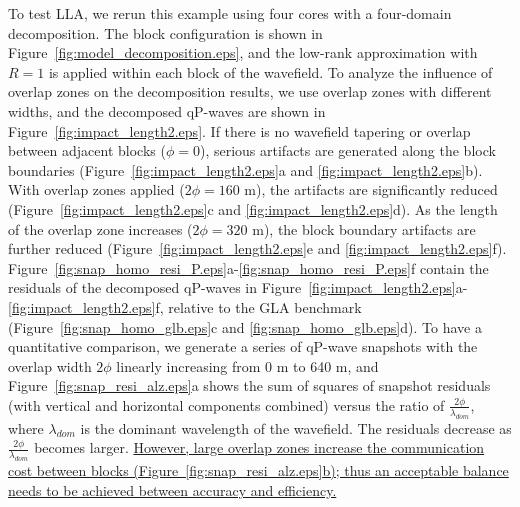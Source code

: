 \documentclass[manuscript,ulem,graphix,revised]{geophysics}
\begin{document}
To test LLA, we rerun this example using four cores with a four-domain decomposition. The block configuration is shown in Figure~\ref{fig:model_decomposition.eps}, and the low-rank approximation with $R=1$ is applied within each block of the wavefield. To analyze the influence of overlap zones on the decomposition results, we use overlap zones with different widths, and the decomposed qP-waves are shown in Figure~\ref{fig:impact_length2.eps}. If there is no wavefield tapering or overlap between adjacent blocks ($\phi=0$), serious artifacts are generated along the block boundaries (Figure~\ref{fig:impact_length2.eps}a and \ref{fig:impact_length2.eps}b). With overlap zones applied ($2\phi=160$ m), the artifacts are significantly reduced (Figure~\ref{fig:impact_length2.eps}c and \ref{fig:impact_length2.eps}d). As the length of the overlap zone increases ($2\phi=320$ m), the block boundary artifacts are further reduced (Figure~\ref{fig:impact_length2.eps}e and \ref{fig:impact_length2.eps}f). Figure~\ref{fig:snap_homo_resi_P.eps}a-\ref{fig:snap_homo_resi_P.eps}f contain the residuals of the decomposed qP-waves in Figure~\ref{fig:impact_length2.eps}a-\ref{fig:impact_length2.eps}f, relative to the GLA benchmark (Figure~\ref{fig:snap_homo_glb.eps}c and \ref{fig:snap_homo_glb.eps}d). 
To have a quantitative comparison, we generate a series of qP-wave snapshots with the overlap width $2\phi$ linearly increasing from 0 m to 640 m, and Figure~\ref{fig:snap_resi_alz.eps}a shows the sum of squares of snapshot residuals (with vertical and horizontal components combined) versus the ratio of $\frac{2\phi}{\lambda_{dom}}$, where $\lambda_{dom}$ is the dominant wavelength of the wavefield. The residuals decrease as $\frac{2\phi}{\lambda_{dom}}$ becomes larger.
\marginnote{[27, 28]}\uline{However, large overlap zones increase the communication cost between blocks (Figure~\ref{fig:snap_resi_alz.eps}b); thus an acceptable balance needs to be achieved between accuracy and efficiency.}


\end{document}
